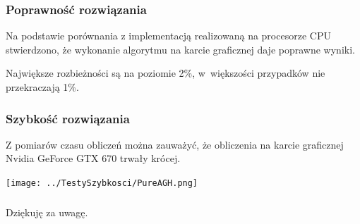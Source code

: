 \begin{frame}
	\frametitle{Poprawność rozwiązania}

	Na podstawie porównania z implementacją realizowaną na procesorze CPU stwierdzono, że wykonanie algorytmu na karcie graficznej daje poprawne wyniki.

	Największe rozbieżności są na poziomie 2\%, w~większości przypadków nie przekraczają 1\%.


\end{frame}
\begin{frame}
	\frametitle{Szybkość rozwiązania}

	Z pomiarów czasu obliczeń można zauważyć, że obliczenia na karcie graficznej Nvidia GeForce GTX 670 trwały krócej.

	\begin{center}
		\texttt{[image: ../TestySzybkosci/PureAGH.png]}
	\end{center}

\end{frame}

\begin{frame}
	\frametitle{}
	\begin{center}
		Dziękuję za uwagę.
	\end{center}
\end{frame}
